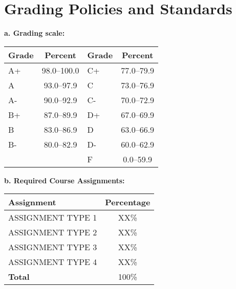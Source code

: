 \documentclass[12pt]{article}
\begin{document}
\section*{Grading Policies and Standards}

\noindent \textbf{a. Grading scale:}

\begin{center}
\begin{tabular}{|l|c||l|c|}
\hline
\textbf{Grade} & \textbf{Percent} & \textbf{Grade} & \textbf{Percent} \\
\hline
A+ & 98.0--100.0 & C+ & 77.0--79.9 \\
A  & 93.0--97.9  & C  & 73.0--76.9 \\
A- & 90.0--92.9  & C- & 70.0--72.9 \\
B+ & 87.0--89.9  & D+ & 67.0--69.9 \\
B  & 83.0--86.9  & D  & 63.0--66.9 \\
B- & 80.0--82.9  & D- & 60.0--62.9 \\
   &             & F  & 0.0--59.9 \\
\hline
\end{tabular}
\end{center}

\vspace{1em}
\noindent \textbf{b. Required Course Assignments:}

\begin{center}
\begin{tabular}{|l|c|}
\hline
\textbf{Assignment} & \textbf{Percentage} \\
\hline
ASSIGNMENT TYPE 1 & XX\% \\
ASSIGNMENT TYPE 2 & XX\% \\
ASSIGNMENT TYPE 3 & XX\% \\
ASSIGNMENT TYPE 4 & XX\% \\
\hline
\textbf{Total} & 100\% \\
\hline
\end{tabular}
\end{center}

\end{document}
